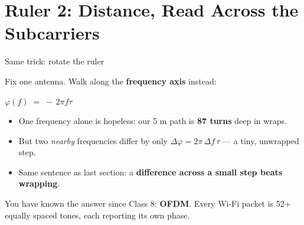 
\section[Distance]{Ruler 2: Distance, Read Across the Subcarriers}


\begin{frame}{Same trick: rotate the ruler}
  \vspace{0.3em}
  {\small Fix one antenna. Walk along the \textcolor{coreorange}{\textbf{frequency
    axis}} instead:\par}
  \vspace{0.2em}
  \centering
  {\large $\varphi(f) \;=\; -\,2\pi f \tau$
   \quad{\small\textcolor{softgray}{($\tau$ = time of flight $= r/c$)}}\par}

  \vspace{0.6em}
  \raggedright
  {\small
   \begin{itemize}\itemsep4pt
     \item One frequency alone is hopeless: our 5 m path is
       \textbf{87 turns} deep in wraps.
     \item But two \emph{nearby} frequencies differ by only
       $\Delta\varphi = 2\pi\,\Delta f\,\tau$ --- a tiny, unwrapped step.
     \item Same sentence as last section: a \textbf{difference across a small
       step beats wrapping}.
   \end{itemize}\par}

  \vspace{0.5em}
     {You have known the answer since Class 8: \textbf{OFDM}. Every Wi-Fi packet
      is 52+ equally spaced tones, each reporting its own phase.}
\end{frame}

